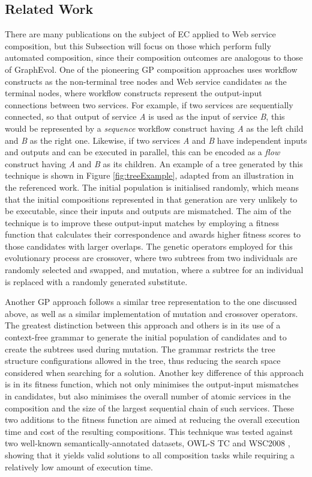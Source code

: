 \documentclass{article}
\begin{document}
\subsection{Related Work}
There are many publications on the subject of EC applied to Web service composition, but this Subsection will focus on those which perform fully automated composition,
since their composition outcomes are analogous to those of GraphEvol. One of the pioneering GP composition approaches \cite{aversano2006genetic} uses workflow constructs as the non-terminal tree nodes and Web service candidates as the terminal nodes, where workflow constructs represent the output-input connections between
two services. For example, if two services are sequentially connected, so that output of service \textit{A} is used as the input of service \textit{B}, this would be represented
by a \textit{sequence} workflow construct having \textit{A} as the left child and \textit{B} as the right one. Likewise, if two services \textit{A} and \textit{B} have independent inputs and outputs and can be executed in parallel, this can be encoded as a \textit{flow} construct having \textit{A} and \textit{B} as its children. An example of a tree generated by this technique is shown in Figure \ref{fig:treeExample}, adapted from an illustration in the referenced work. The initial population is initialised randomly, which means that the initial compositions represented in that generation are very unlikely to be executable, since their inputs and outputs are mismatched. The aim of the technique is to improve these output-input matches by employing a fitness function that calculates their correspondence and awards higher fitness scores to those candidates with larger overlaps. The genetic operators employed for this evolutionary process are crossover, where two subtrees from two individuals are randomly selected and swapped, and mutation, where a subtree for an individual is replaced with a randomly generated substitute.

Another GP approach \cite{rodriguez2010composition} follows a similar tree representation to the one discussed above, as well as a similar implementation of mutation and crossover operators. The greatest distinction between this approach and others is in its use of a context-free grammar to generate the initial population of candidates and to create the subtrees used during mutation. The grammar restricts the tree structure configurations allowed in the tree, thus reducing the search space considered when searching for a solution. Another key difference of this approach is in its fitness function, which not only minimises the output-input mismatches in candidates, but also minimises the overall number of atomic services in the composition and the size of the largest sequential chain of such services. These two additions to the fitness function are aimed at reducing the overall execution time and cost of the resulting compositions. This technique was tested against two well-known semantically-annotated datasets, OWL-S TC \cite{kuster2008opossum} and WSC2008 \cite{bansal2008wsc}, showing that it yields valid solutions to all composition tasks while requiring a relatively low amount of execution time.
\end{document}
